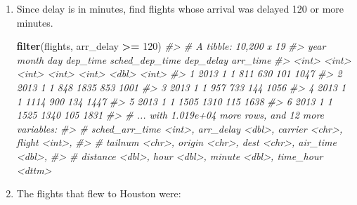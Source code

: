 \documentclass[]{book}
\newenvironment{Shaded}{\begin{snugshade}}{\end{snugshade}}
\newcommand{\CommentTok}[1]{\textcolor[rgb]{0.56,0.35,0.01}{\textit{#1}}}
\newcommand{\DecValTok}[1]{\textcolor[rgb]{0.00,0.00,0.81}{#1}}
\newcommand{\KeywordTok}[1]{\textcolor[rgb]{0.13,0.29,0.53}{\textbf{#1}}}
\newcommand{\NormalTok}[1]{#1}
\newcommand{\OperatorTok}[1]{\textcolor[rgb]{0.81,0.36,0.00}{\textbf{#1}}}
\newcommand{\StringTok}[1]{\textcolor[rgb]{0.31,0.60,0.02}{#1}}
\theoremstyle{plain}
\theoremstyle{remark}
\theoremstyle{definition}
\theoremstyle{definition}
\theoremstyle{definition}
\theoremstyle{remark}
\begin{document}
\begin{enumerate}
\def\labelenumi{\arabic{enumi}.}
\item
  Since delay is in minutes, find flights whose arrival was delayed 120
  or more minutes.

\begin{Shaded}
\begin{Highlighting}[]
\KeywordTok{filter}\NormalTok{(flights, arr_delay }\OperatorTok{>=}\StringTok{ }\DecValTok{120}\NormalTok{)}
\CommentTok{#> # A tibble: 10,200 x 19}
\CommentTok{#>    year month   day dep_time sched_dep_time dep_delay arr_time}
\CommentTok{#>   <int> <int> <int>    <int>          <int>     <dbl>    <int>}
\CommentTok{#> 1  2013     1     1      811            630       101     1047}
\CommentTok{#> 2  2013     1     1      848           1835       853     1001}
\CommentTok{#> 3  2013     1     1      957            733       144     1056}
\CommentTok{#> 4  2013     1     1     1114            900       134     1447}
\CommentTok{#> 5  2013     1     1     1505           1310       115     1638}
\CommentTok{#> 6  2013     1     1     1525           1340       105     1831}
\CommentTok{#> # ... with 1.019e+04 more rows, and 12 more variables:}
\CommentTok{#> #   sched_arr_time <int>, arr_delay <dbl>, carrier <chr>, flight <int>,}
\CommentTok{#> #   tailnum <chr>, origin <chr>, dest <chr>, air_time <dbl>,}
\CommentTok{#> #   distance <dbl>, hour <dbl>, minute <dbl>, time_hour <dttm>}
\end{Highlighting}
\end{Shaded}
\item
  The flights that flew to Houston were:


\end{enumerate}
\end{document}
